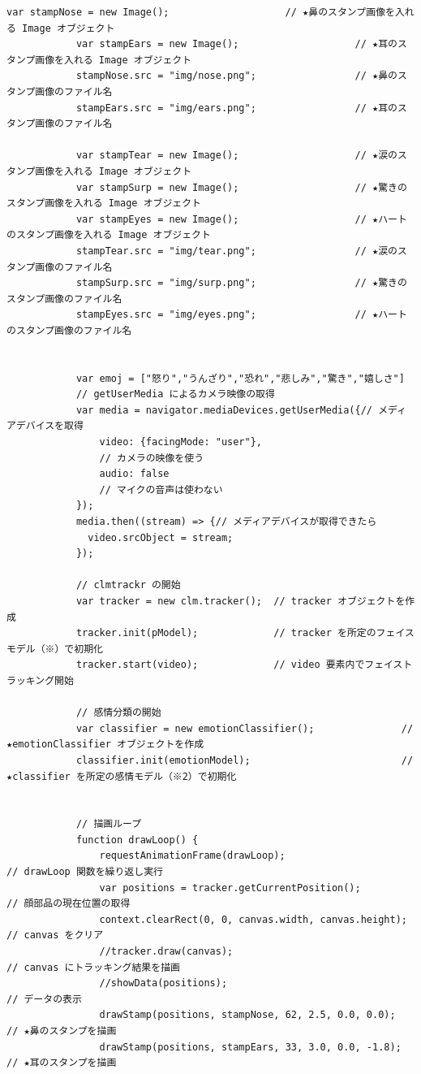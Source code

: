 \documentclass[mingoth,11pt,a4j,uplatex]{jsarticle}
\begin{document}
\begin{lstlisting}[caption=07-06.html]
            var stampNose = new Image();                    // ★鼻のスタンプ画像を入れる Image オブジェクト
            var stampEars = new Image();                    // ★耳のスタンプ画像を入れる Image オブジェクト
            stampNose.src = "img/nose.png";                 // ★鼻のスタンプ画像のファイル名
            stampEars.src = "img/ears.png";                 // ★耳のスタンプ画像のファイル名

            var stampTear = new Image();                    // ★涙のスタンプ画像を入れる Image オブジェクト
            var stampSurp = new Image();                    // ★驚きのスタンプ画像を入れる Image オブジェクト
            var stampEyes = new Image();                    // ★ハートのスタンプ画像を入れる Image オブジェクト
            stampTear.src = "img/tear.png";                 // ★涙のスタンプ画像のファイル名
            stampSurp.src = "img/surp.png";                 // ★驚きのスタンプ画像のファイル名
            stampEyes.src = "img/eyes.png";                 // ★ハートのスタンプ画像のファイル名
            
            
            var emoj = ["怒り","うんざり","恐れ","悲しみ","驚き","嬉しさ"]
            // getUserMedia によるカメラ映像の取得
            var media = navigator.mediaDevices.getUserMedia({// メディアデバイスを取得
                video: {facingMode: "user"},                          
                // カメラの映像を使う
                audio: false                                          
                // マイクの音声は使わない
            });
            media.then((stream) => {// メディアデバイスが取得できたら
              video.srcObject = stream;
            });
            
            // clmtrackr の開始
            var tracker = new clm.tracker();  // tracker オブジェクトを作成
            tracker.init(pModel);             // tracker を所定のフェイスモデル（※）で初期化
            tracker.start(video);             // video 要素内でフェイストラッキング開始

            // 感情分類の開始
            var classifier = new emotionClassifier();               // ★emotionClassifier オブジェクトを作成
            classifier.init(emotionModel);                          // ★classifier を所定の感情モデル（※2）で初期化

            
            // 描画ループ
            function drawLoop() {
                requestAnimationFrame(drawLoop);                      // drawLoop 関数を繰り返し実行
                var positions = tracker.getCurrentPosition();         // 顔部品の現在位置の取得
                context.clearRect(0, 0, canvas.width, canvas.height); // canvas をクリア
                //tracker.draw(canvas);                                 // canvas にトラッキング結果を描画
                //showData(positions);                                  // データの表示
                drawStamp(positions, stampNose, 62, 2.5, 0.0, 0.0);   // ★鼻のスタンプを描画
                drawStamp(positions, stampEars, 33, 3.0, 0.0, -1.8);  // ★耳のスタンプを描画


\end{lstlisting}
\end{document}

